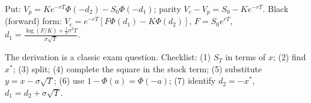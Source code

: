 \documentclass[10pt]{article}
\begin{document}
\begin{where}
\end{where}
\beyond{} Put: $V_p=Ke^{-rT}\Phi(-d_2)-S_0\Phi(-d_1)$; parity $V_c-V_p=S_0-Ke^{-rT}$. Black (forward) form: $V_c=e^{-rT}[F\Phi(d_1)-K\Phi(d_2)]$, $F=S_0e^{rT}$, $d_1=\frac{\log(F/K)+\frac12\sigma^2T}{\sigma\sqrt T}$.
\begin{exam}
The derivation is a classic exam question. Checklist: (1) $S_T$ in terms of $x$; (2) find $x^*$; (3) split; (4) complete the square in the stock term; (5) substitute $y=x-\sigma\sqrt T$; (6) use $1-\Phi(a)=\Phi(-a)$; (7) identify $d_2=-x^*$, $d_1=d_2+\sigma\sqrt T$.
\end{exam}
\end{document}
